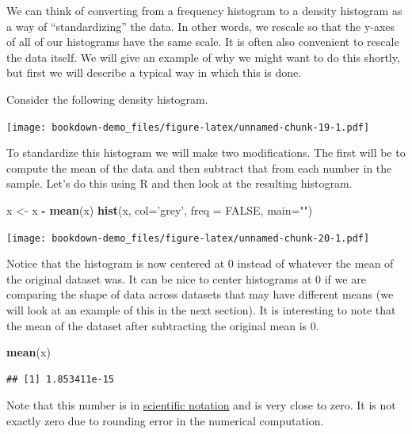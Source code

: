 \documentclass[]{book}
\newenvironment{Shaded}{\begin{snugshade}}{\end{snugshade}}
\newcommand{\DataTypeTok}[1]{\textcolor[rgb]{0.13,0.29,0.53}{#1}}
\newcommand{\KeywordTok}[1]{\textcolor[rgb]{0.13,0.29,0.53}{\textbf{#1}}}
\newcommand{\NormalTok}[1]{#1}
\newcommand{\OperatorTok}[1]{\textcolor[rgb]{0.81,0.36,0.00}{\textbf{#1}}}
\newcommand{\OtherTok}[1]{\textcolor[rgb]{0.56,0.35,0.01}{#1}}
\newcommand{\StringTok}[1]{\textcolor[rgb]{0.31,0.60,0.02}{#1}}
\begin{document}
We can think of converting from a frequency histogram to a density histogram as a way of ``standardizing'' the data. In other words, we rescale so that the y-axes of all of our histograms have the same scale. It is often also convenient to rescale the data itself. We will give an example of why we might want to do this shortly, but first we will describe a typical way in which this is done.

Consider the following density histogram.

\texttt{[image: bookdown-demo\_files/figure-latex/unnamed-chunk-19-1.pdf]}

To standardize this histogram we will make two modifications. The first will be to compute the mean of the data and then subtract that from each number in the sample. Let's do this using R and then look at the resulting histogram.

\begin{Shaded}
\begin{Highlighting}[]
\NormalTok{x <-}\StringTok{ }\NormalTok{x }\OperatorTok{-}\StringTok{ }\KeywordTok{mean}\NormalTok{(x)}
\KeywordTok{hist}\NormalTok{(x, }\DataTypeTok{col=}\StringTok{'grey'}\NormalTok{, }\DataTypeTok{freq =} \OtherTok{FALSE}\NormalTok{, }\DataTypeTok{main=}\StringTok{""}\NormalTok{)}
\end{Highlighting}
\end{Shaded}

\texttt{[image: bookdown-demo\_files/figure-latex/unnamed-chunk-20-1.pdf]}

Notice that the histogram is now centered at \(0\) instead of whatever the mean of the original dataset was. It can be nice to center histograms at \(0\) if we are comparing the shape of data across datasets that may have different means (we will look at an example of this in the next section). It is interesting to note that the mean of the dataset after subtracting the original mean is \(0\).

\begin{Shaded}
\begin{Highlighting}[]
\KeywordTok{mean}\NormalTok{(x)}
\end{Highlighting}
\end{Shaded}

\begin{verbatim}
## [1] 1.853411e-15
\end{verbatim}

Note that this number is in \href{https://en.wikipedia.org/wiki/Scientific_notation}{scientific notation} and is very close to zero. It is not exactly zero due to rounding error in the numerical computation.
\end{document}
